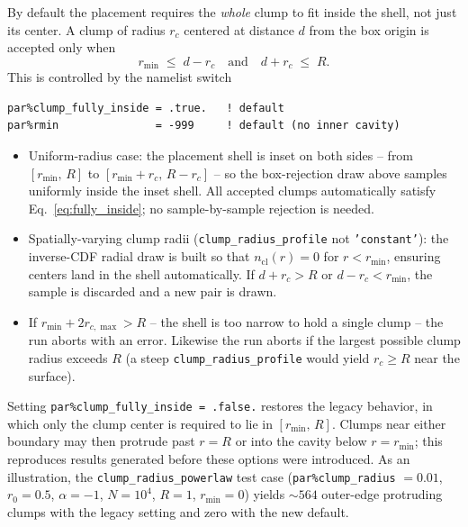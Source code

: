\documentclass[english,a4paper]{my_memo}
\begin{document}
By default the placement requires the \emph{whole} clump to fit inside the
shell, not just its center.  A clump of radius $r_c$ centered at distance
$d$ from the box origin is accepted only when
\begin{equation}
   r_\mathrm{min} \;\le\; d - r_c \quad\text{and}\quad d + r_c \;\le\; R.
\label{eq:fully_inside}
\end{equation}
This is controlled by the namelist switch
\begin{lstlisting}
par%clump_fully_inside = .true.   ! default
par%rmin               = -999     ! default (no inner cavity)
\end{lstlisting}
\begin{itemize}
\item Uniform-radius case: the placement shell is inset on both sides --
      from $[r_\mathrm{min},\,R]$ to $[r_\mathrm{min} + r_c,\,R - r_c]$ --
      so the box-rejection draw above samples uniformly inside the inset
      shell.  All accepted clumps automatically satisfy
      Eq.~\eqref{eq:fully_inside}; no sample-by-sample rejection is needed.
\item Spatially-varying clump radii (\texttt{clump\_radius\_profile} not
      \texttt{'constant'}): the inverse-CDF radial draw is built so that
      $n_\mathrm{cl}(r) = 0$ for $r < r_\mathrm{min}$, ensuring centers
      land in the shell automatically.  If
      $d + r_c > R$ or $d - r_c < r_\mathrm{min}$, the sample is discarded
      and a new pair is drawn.
\item If $r_\mathrm{min} + 2 r_{c,\max} > R$ -- the shell is too narrow to
      hold a single clump -- the run aborts with an error.  Likewise the
      run aborts if the largest possible clump radius exceeds $R$ (a steep
      \texttt{clump\_radius\_profile} would yield $r_c \ge R$ near the
      surface).
\end{itemize}

Setting \verb|par%clump_fully_inside = .false.| restores the legacy
behavior, in which only the clump center is required to lie in
$[r_\mathrm{min},\,R]$.  Clumps near either boundary may then protrude
past $r = R$ or into the cavity below $r = r_\mathrm{min}$; this
reproduces results generated before these options were introduced.  As an
illustration, the \texttt{clump\_radius\_powerlaw} test case
(\texttt{par\%clump\_radius} $= 0.01$, $r_0 = 0.5$, $\alpha = -1$,
$N = 10^4$, $R = 1$, $r_\mathrm{min} = 0$) yields $\sim 564$ outer-edge
protruding clumps with the legacy setting and zero with the new default.
\end{document}
